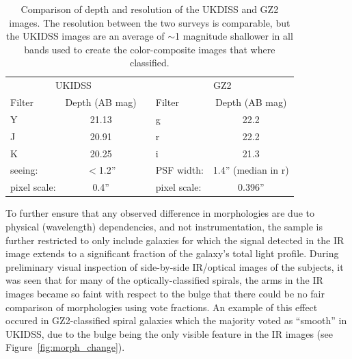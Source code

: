 \begin{center}
\begin{table}
\begin{tabular}{lcclc}
\hline \hline
\multicolumn{2}{c}{UKIDSS} & & \multicolumn{2}{c}{GZ2} \\
\cline{1-2}\cline{4-5}
Filter & Depth (AB mag) & & Filter & Depth (AB mag) \\

Y      & 21.13 & & g      & 22.2 \\
J      & 20.91 & & r      & 22.2 \\
K      & 20.25  & & i      & 21.3 \\
\cline{1-2}\cline{4-5}
seeing: & $<$1.2'' & & PSF width: & 1.4'' (median in r) \\
pixel scale: & 0.4'' & & pixel scale: & 0.396'' \\
\hline \hline
\end{tabular}
\caption{Comparison of depth and resolution of the UKDISS and GZ2 images. The resolution between the two surveys is comparable, but the UKIDSS images are an average of $\sim$1 magnitude shallower in all bands used to create the color-composite images that where classified. }
\label{tab:uk_gz2_instrumentation}
\end{table}
\end{center}

To further ensure that any observed difference in morphologies are due to physical (wavelength) dependencies, and not instrumentation, the sample is further restricted to only include galaxies for which the signal detected in the IR image extends to a significant fraction of the galaxy's total light profile. During preliminary visual inspection of side-by-side IR/optical images of the subjects, it was seen that for many of the optically-classified spirals, the arms in the IR images became so faint with respect to the bulge that there could be no fair comparison of morphologies using vote fractions. An example of this effect occured in GZ2-classified spiral galaxies which the majority voted as ``smooth'' in UKIDSS, due to the bulge being the only visible feature in the IR images (see Figure~\ref{fig:morph_change}).  %

